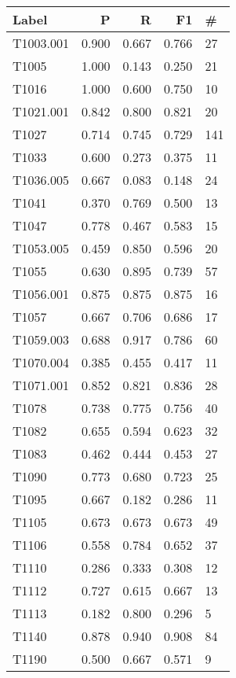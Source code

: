 \begin{tabular}{lrrrl}
    \toprule
    Label     & P     & R     & F1    & \#  \\
    \midrule
    T1003.001 & 0.900 & 0.667 & 0.766 & 27  \\
    T1005     & 1.000 & 0.143 & 0.250 & 21  \\
    T1016     & 1.000 & 0.600 & 0.750 & 10  \\
    T1021.001 & 0.842 & 0.800 & 0.821 & 20  \\
    T1027     & 0.714 & 0.745 & 0.729 & 141 \\
    T1033     & 0.600 & 0.273 & 0.375 & 11  \\
    T1036.005 & 0.667 & 0.083 & 0.148 & 24  \\
    T1041     & 0.370 & 0.769 & 0.500 & 13  \\
    T1047     & 0.778 & 0.467 & 0.583 & 15  \\
    T1053.005 & 0.459 & 0.850 & 0.596 & 20  \\
    T1055     & 0.630 & 0.895 & 0.739 & 57  \\
    T1056.001 & 0.875 & 0.875 & 0.875 & 16  \\
    T1057     & 0.667 & 0.706 & 0.686 & 17  \\
    T1059.003 & 0.688 & 0.917 & 0.786 & 60  \\
    T1070.004 & 0.385 & 0.455 & 0.417 & 11  \\
    T1071.001 & 0.852 & 0.821 & 0.836 & 28  \\
    T1078     & 0.738 & 0.775 & 0.756 & 40  \\
    T1082     & 0.655 & 0.594 & 0.623 & 32  \\
    T1083     & 0.462 & 0.444 & 0.453 & 27  \\
    T1090     & 0.773 & 0.680 & 0.723 & 25  \\
    T1095     & 0.667 & 0.182 & 0.286 & 11  \\
    T1105     & 0.673 & 0.673 & 0.673 & 49  \\
    T1106     & 0.558 & 0.784 & 0.652 & 37  \\
    T1110     & 0.286 & 0.333 & 0.308 & 12  \\
    T1112     & 0.727 & 0.615 & 0.667 & 13  \\
    T1113     & 0.182 & 0.800 & 0.296 & 5   \\
    T1140     & 0.878 & 0.940 & 0.908 & 84  \\
    T1190     & 0.500 & 0.667 & 0.571 & 9   \\

\end{tabular}
